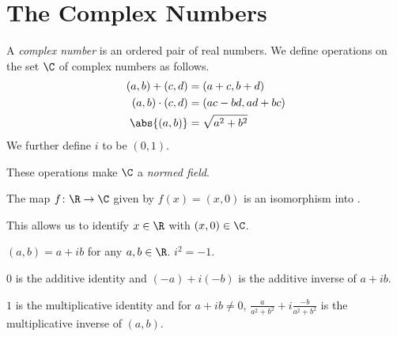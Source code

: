 
\section{The Complex Numbers} \label{sec:C}
\begin{definition}
    A \emph{complex number} is an ordered pair of real numbers.
    We define operations on the set $\C$ of complex numbers as follows.
    \begin{align*}
        (a, b) + (c, d) &= (a + c, b + d) \\
        (a, b) \cdot (c, d) &= (ac - bd, ad + bc) \\
        \abs{(a, b)} &= \sqrt{a^2 + b^2}
    \end{align*}
    We further define $i$ to be $(0, 1)$.
\end{definition}
\begin{remark}
    These operations make $\C$ a \emph{normed field}.
\end{remark}

\begin{theorem}
    The map $f\colon \R \to \C$ given by $f(x) = (x, 0)$ is an isomorphism
    into \C.
\end{theorem}
This allows us to identify $x \in \R$ with $(x, 0) \in \C$.

\begin{remark}
    $(a, b) = a + ib$ for any $a, b \in \R$.
    $i^2 = -1$.

    $0$ is the additive identity and $(-a) + i(-b)$ is the additive inverse
    of $a + ib$.

    $1$ is the multiplicative identity and for $a + ib \ne 0$,
    $\frac{a}{a^2 + b^2} + i \frac{-b}{a^2 + b^2}$ is the multiplicative
    inverse of $(a, b)$.
\end{remark}

